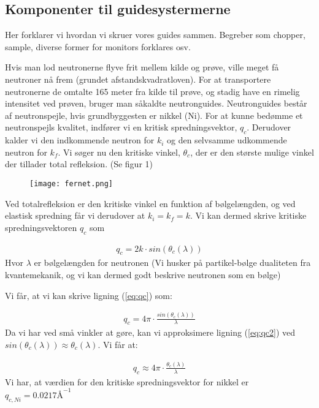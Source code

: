 \documentclass[12pt,oneside,a4paper]{article}
\begin{document}
{{{{{\subsection{Komponenter til guidesystermerne}
Her forklarer vi hvordan vi skruer vores guides sammen. Begreber som chopper, sample, diverse former for monitors forklares osv.

Hvis man lod neutronerne flyve frit mellem kilde og prøve, ville meget få neutroner nå frem (grundet afstandskvadratloven). For at transportere neutronerne de omtalte 165 meter fra kilde til prøve, og stadig have en rimelig intensitet ved prøven, bruger man såkaldte neutronguides. Neutronguides består af neutronspejle, hvis grundbyggesten er nikkel (Ni). For at kunne bedømme et neutronspejls kvalitet, indfører vi en kritisk spredningsvektor, $q_c$. Derudover kalder vi den indkommende neutron for $k_i$ og den selvsamme udkommende neutron for $k_f$. Vi søger nu den kritiske vinkel, $\theta_c$, der er den største mulige vinkel der tillader total refleksion. (Se figur 1)

\begin{figure}[H]
\centering
\texttt{[image: fernet.png]}
\caption{\label{Billede}}
\end{figure}


Ved totalrefleksion er den kritiske vinkel en funktion af bølgelængden, og ved elastisk spredning får vi derudover at $k_i=k_f=k$. Vi kan dermed skrive kritiske spredningsvektoren $q_c$ som

\begin{align} \label{eq:qc}
q_c=2k \cdot sin(\theta_c (\lambda))
\end{align}
Hvor $\lambda$ er bølgelængden for neutronen (Vi husker på partikel-bølge dualiteten fra kvantemekanik, og vi kan dermed godt beskrive neutronen som en bølge)

Vi får, at vi kan skrive ligning (\ref{eq:qc}) som:

\begin{align} \label{eq:qc2}
q_c=4\pi \cdot \frac{sin(\theta_c(\lambda))}{\lambda}
\end{align}
Da vi har ved små vinkler at gøre, kan vi approksimere ligning (\ref{eq:qc2})  ved \\ $sin(\theta_c(\lambda))≈\theta_c(\lambda)$. Vi får at:

\begin{align}
q_c≈4\pi \cdot \frac{\theta_c (\lambda)}{\lambda}
\end{align}
Vi har, at værdien for den kritiske spredningsvektor for nikkel er $q_{c, Ni}=0.0217\text{Å} ^{-1}$ \cite{lefmann_arleth_kirkensgaard_lebech_thomsen}

}}}}}
\end{document}
